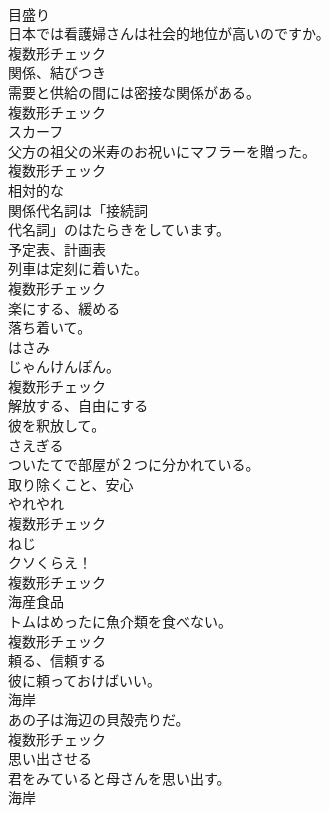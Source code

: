 \documentclass[8pt]{extreport}
\begin{document}
\begin{CJK}{UTF8}{min}
\\	[名詞]	目盛り	
\\	日本では看護婦さんは社会的地位が高いのですか。	
\\	複数形チェック
\\	[名詞]	関係、結びつき	
\\	需要と供給の間には密接な関係がある。	
\\	複数形チェック
\\	[名詞]	スカーフ	
\\	父方の祖父の米寿のお祝いにマフラーを贈った。	
\\	複数形チェック
\\	[形容詞]	相対的な	
\\	関係代名詞は「接続詞
\\	代名詞」のはたらきをしています。	
\\	[名詞]	予定表、計画表	
\\	列車は定刻に着いた。	
\\	複数形チェック
\\	[動詞]	楽にする、緩める	
\\	落ち着いて。	
\\	[名詞]	はさみ	
\\	じゃんけんぽん。	
\\	複数形チェック
\\	[動詞]	解放する、自由にする	
\\	彼を釈放して。	
\\	[動詞]	さえぎる	
\\	ついたてで部屋が２つに分かれている。	
\\	[名詞]	取り除くこと、安心	
\\	やれやれ	
\\	複数形チェック
\\	[名詞]	ねじ	
\\	クソくらえ！	
\\	複数形チェック
\\	[名詞]	海産食品	
\\	トムはめったに魚介類を食べない。	
\\	複数形チェック
\\	[動詞]	頼る、信頼する	
\\	彼に頼っておけばいい。	
\\	[名詞]	海岸	
\\	あの子は海辺の貝殻売りだ。	
\\	複数形チェック
\\	[動詞]	思い出させる	
\\	君をみていると母さんを思い出す。	
\\	[名詞]	海岸	

\end{CJK}
\end{document}
